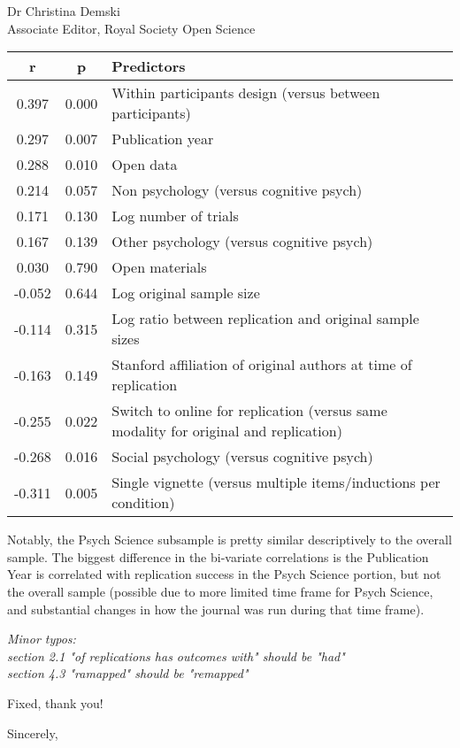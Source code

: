 \documentclass{stanfordletter}
\newcommand{\theysaid}[1]{\begin{leftbar} \noindent 
		\textsl{ #1}\end{leftbar}}
\begin{document}
\begin{letter}{Dr Christina Demski \\ Associate Editor, Royal Society Open Science}
\begin{center}
          \fontsize{10}{12}\selectfont
          \begin{tabular}[t]{ccl}
          	\toprule
          	r & p & Predictors\\
          	\midrule
          	0.397 & 0.000 & Within participants design (versus between participants)\\
          	0.297 & 0.007 & Publication year\\
          	0.288 & 0.010 & Open data\\
          	0.214 & 0.057 & Non psychology (versus cognitive psych)\\
          	0.171 & 0.130 & Log number of  trials\\
          	0.167 & 0.139 & Other psychology (versus cognitive psych)\\
          	0.030 & 0.790 & Open materials\\
          	-0.052 & 0.644 & Log original sample size\\
          	-0.114 & 0.315 & Log ratio between replication and original sample sizes\\
          	-0.163 & 0.149 & Stanford affiliation of original authors at time of replication\\
          	-0.255 & 0.022 & Switch to online for replication (versus same modality for original and replication)\\
          	-0.268 & 0.016 & Social psychology (versus cognitive psych)\\
          	-0.311 & 0.005 & Single vignette (versus multiple items/inductions per condition)\\
          	\bottomrule
          \end{tabular}
          \end{center}

Notably, the Psych Science subsample is pretty similar descriptively to the overall sample. The biggest difference in the bi-variate correlations is the Publication Year is correlated with replication success in the Psych Science portion, but not the overall sample (possible due to more limited time frame for Psych Science, and substantial changes in how the journal was run during that time frame). 
          	\theysaid{
          	Minor typos:\\
          	section 2.1 "of replications has outcomes with" should be "had"\\
          	section 4.3 "ramapped" should be "remapped"
          }
          Fixed, thank you!
          
          
          \closing{Sincerely,}
		
	\end{letter}
	
\end{document}

